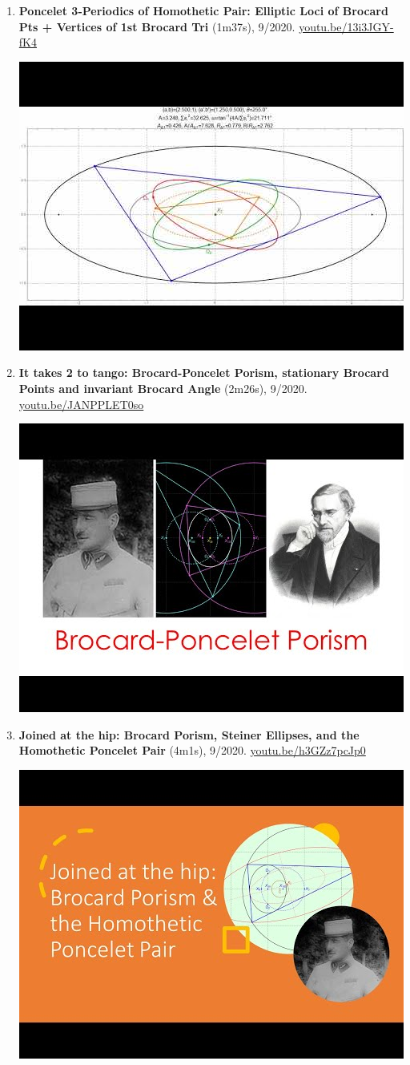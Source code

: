 \documentclass[12pt]{article}
\begin{document}
\begin{enumerate}[resume]
\item \textbf{Poncelet 3-Periodics of Homothetic Pair: Elliptic Loci of Brocard Pts + Vertices of 1st Brocard Tri} (1m37s), 9/2020. \href{https://youtu.be/13i3JGY-fK4}{\url{youtu.be/13i3JGY-fK4}}
\begin{center}\includegraphics[width=.5\textwidth]{pics/13i3JGY-fK4.jpg}\end{center}
% 
\item \textbf{It takes 2 to tango: Brocard-Poncelet Porism, stationary Brocard Points and invariant Brocard Angle} (2m26s), 9/2020. \href{https://youtu.be/JANPPLET0so}{\url{youtu.be/JANPPLET0so}}
\begin{center}\includegraphics[width=.5\textwidth]{pics/JANPPLET0so.jpg}\end{center}
% 
\item \textbf{Joined at the hip: Brocard Porism, Steiner Ellipses, and the Homothetic Poncelet Pair} (4m1s), 9/2020. \href{https://youtu.be/h3GZz7pcJp0}{\url{youtu.be/h3GZz7pcJp0}}
\begin{center}\includegraphics[width=.5\textwidth]{pics/h3GZz7pcJp0.jpg}\end{center}

\end{enumerate}
\end{document}
